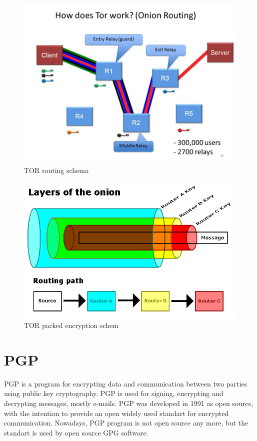 \documentclass[
  digital, %
  table,   %
  lof,     %
  lot,     %
  oneside
]{fithesis3}
\begin{document}
 \begin{figure}[!htb]
    \centering
    \includegraphics[width=1\textwidth]{tor-prejate}
    \caption{TOR routing schema}
    \label{TOR routing schema}
\end{figure}
 
  \begin{figure}[!htb]
    \centering
    \includegraphics[width=1\textwidth]{tor-packet-prejate}
    \caption{TOR packed encryption schem}
    \label{TOR packed encryption schema}
\end{figure}
 
\section{PGP}

PGP is a program for encrypting data and communication between two parties using public key cryptography.
PGP is used for signing, encrypting and decrypting messages, mostly e-mails.
PGP was developed in 1991 as open source, with the intention 
to provide an open widely used standart for encrypted communication.
Nowadays, PGP program is not open source any more, but the standart is used by open source GPG software.
\end{document}
